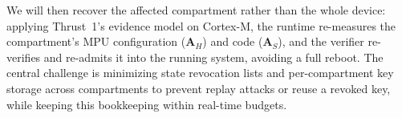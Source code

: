 We will then recover the affected compartment rather than the whole device: applying Thrust~1's evidence model on Cortex-M, the runtime re-measures the compartment's MPU configuration ($\mathbf{A}_H$) and code ($\mathbf{A}_S$), and the verifier re-verifies and re-admits it into the running system, avoiding a full reboot.
The central challenge is minimizing state revocation lists and per-compartment key storage across compartments to prevent replay attacks or reuse a revoked key, while keeping this bookkeeping within real-time budgets.
